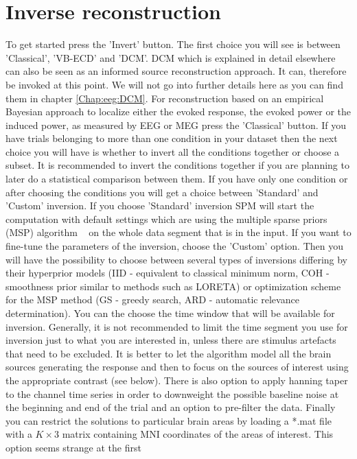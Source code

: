 \section{Inverse reconstruction}
To get started press the 'Invert' button. The first
choice you will see is between 'Classical', 'VB-ECD' and 'DCM'. DCM which is explained in detail elsewhere can also be seen as an 
informed source reconstruction approach. It can, therefore be invoked at this point. We will not go into further details here as you
can find them in chapter \ref{Chap:eeg:DCM}. For reconstruction based on an empirical Bayesian approach to localize either the evoked response, 
the evoked power or the induced power, as measured by EEG or MEG press the 'Classical' button. If you have trials belonging to more than one condition
in your dataset then the next choice you will have is whether to invert all the conditions together or choose a subset. It is recommended to invert
the conditions together if you are planning to later do a statistical comparison between them. If you have only one condition or after choosing
the conditions you will get a choice between 'Standard' and 'Custom' inversion. If you choose 'Standard' inversion SPM will start the computation
with default settings which are using the multiple sparse priors (MSP) algorithm ~\cite{karl_msp} on the whole data segment that is in the input.
If you want to fine-tune the parameters of the inversion, choose the 'Custom' option.
Then you will have the possibility to choose between several types of inversions differing by their hyperprior models (IID - equivalent to classical
minimum norm, COH - smoothness prior similar to methods such as LORETA) or optimization scheme for the MSP method (GS - greedy search, ARD - automatic
relevance determination). You can the choose the time window that will be available for inversion. Generally, it is not recommended to limit the time
segment you use for inversion just to what you are interested in, unless there are stimulus artefacts
that need to be excluded. It is better to let the algorithm model all the brain sources generating the response and then to focus on the sources
of interest using the appropriate contrast (see below). There is also option to apply hanning taper to the channel time series in order to downweight
the possible baseline noise at the beginning and end of the trial and an option to pre-filter the data. Finally you can restrict the solutions to particular
brain areas by loading a *.mat file with a $K \times 3$ matrix containing MNI coordinates of the areas of interest. This option seems strange at the first
